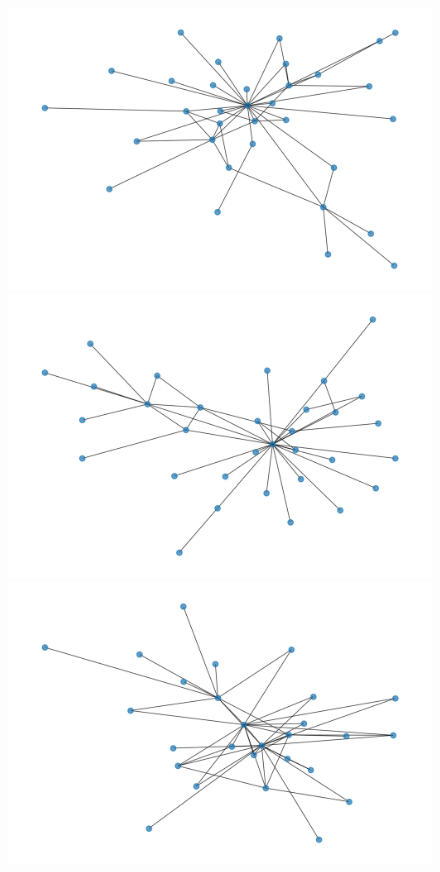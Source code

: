 \begin{figure}[htbp]
\begin{minipage}{.24\textwidth}
	\end{minipage}
	\begin{minipage}{.24\textwidth}
		\centering
		\includegraphics[width=1\linewidth]{problem_02/network_phase4}
	\end{minipage}
		\begin{minipage}{.24\textwidth}
		\centering
		\includegraphics[width=1\linewidth]{problem_02/network_phase5}
	\end{minipage}
	\begin{minipage}{.24\textwidth}
		\centering
		\includegraphics[width=1\linewidth]{problem_02/network_phase6}

\end{minipage}
\end{figure}
